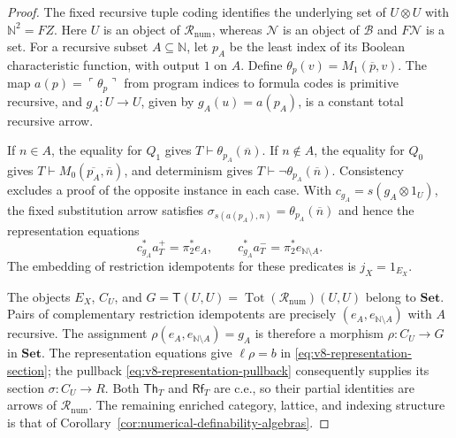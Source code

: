 \documentclass[11pt]{article}
\theoremstyle{definition}
\theoremstyle{remark}
\begin{document}
\begin{proof}
The fixed recursive tuple coding identifies the underlying set
of $U\otimes U$ with $\mathbb N^2=FZ$. Here $U$ is an object
of $\mathcal R_{\mathrm{num}}$, whereas $\mathcal N$ is an
object of $\mathcal B$ and $F\mathcal N$ is a set.
For a recursive subset $A\subseteq\mathbb N$, let $p_A$ be
the least index of its Boolean characteristic function, with
output $1$ on $A$. Define $\theta_p(v)=M_1(\overline p,v)$.
The map $a(p)=\ulcorner\theta_p\urcorner$ from program indices
to formula codes is primitive recursive, and
$g_A:U\to U$, given by $g_A(u)=a(p_A)$, is a constant total
recursive arrow.

If $n\in A$, the equality for $Q_1$ gives
$T\vdash\theta_{p_A}(\overline n)$.
If $n\notin A$, the equality for $Q_0$ gives
$T\vdash M_0(\overline{p_A},\overline n)$, and determinism
gives $T\vdash\neg\theta_{p_A}(\overline n)$.
Consistency excludes a proof of the opposite instance in each
case. With $c_{g_A}=s(g_A\otimes1_U)$, the fixed substitution
arrow satisfies
$\sigma_{s(a(p_A),n)}=\theta_{p_A}(\overline n)$ and hence the
representation equations
\[
 c_{g_A}^*a_T^+=\pi_2^*e_A,
 \qquad
 c_{g_A}^*a_T^-=\pi_2^*e_{\mathbb N\setminus A}.
\]
The embedding of restriction idempotents for these predicates is $j_X=1_{E_X}$.

The objects $E_X$, $C_U$, and
$G=\mathsf T(U,U)=\operatorname{Tot}(\mathcal R_{\mathrm{num}})(U,U)$
belong to $\mathbf{Set}$.
Pairs of complementary restriction idempotents are precisely
$(e_A,e_{\mathbb N\setminus A})$ with $A$ recursive.
The assignment
$\rho(e_A,e_{\mathbb N\setminus A})=g_A$ is therefore a
morphism $\rho:C_U\to G$ in $\mathbf{Set}$.
The representation equations give $\ell\rho=b$ in
\eqref{eq:v8-representation-section}; the pullback
\eqref{eq:v8-representation-pullback} consequently supplies its
section $\sigma:C_U\to R$.
Both $\mathsf{Th}_T$ and $\mathsf{Rf}_T$ are c.e., so their
partial identities are arrows of $\mathcal R_{\mathrm{num}}$.
The remaining enriched category, lattice, and indexing structure
is that of Corollary~\ref{cor:numerical-definability-algebras}.
\end{proof}
\end{document}
